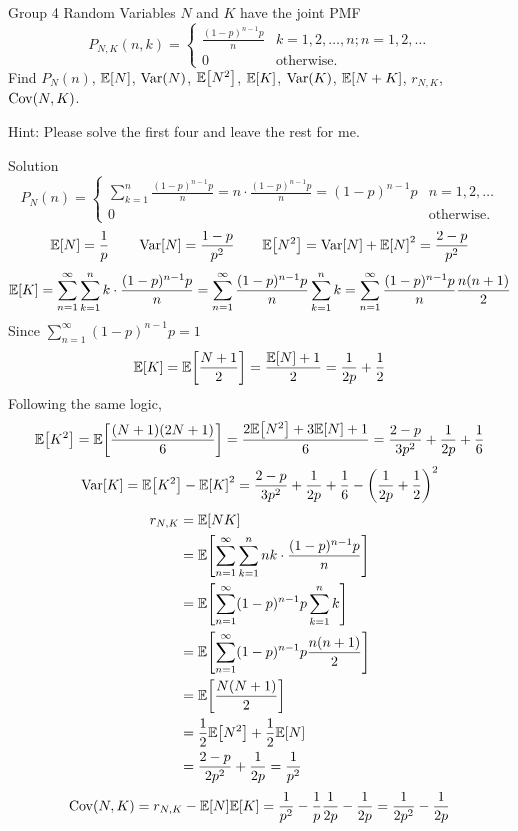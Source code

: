 \documentclass{article}
\begin{document}
\begin{problem}
    {Group 4}
    Random Variables $N$ and $K$ have the joint PMF
    \[
    P_{N,K}(n,k)={
        \begin{cases}
            \frac{(1-p)^{n-1}p}{n} & k=1,2,\ldots,n; n=1,2,\ldots\\
            0 & \text{otherwise.}
        \end{cases}
    }
    \]
    Find $P_N(n)$, $\E{N}$, $\mathop{\mathrm{Var}}\nolimits(N)$, $\E{N^2}$, $\E{K}$, $\mathop{\mathrm{Var}}\nolimits(K)$, $\E{N+K}$, $r_{N,K}$, $\mathop{\mathrm{Cov}}\nolimits(N,K)$.
    \begin{solution}
        {Hint:}
        Please solve the first four and leave the rest for me.
    \end{solution}
\end{problem}

\begin{solution}
    {Solution}
    \[
    P_N(n)={
        \begin{cases}
            \sum_{k=1}^{n}\frac{(1-p)^{n-1}p}{n}=n\cdot\frac{(1-p)^{n-1}p}{n}=(1-p)^{n-1}p & n=1,2,\ldots\\
            0 & \text{otherwise.}
        \end{cases}
    }
    \]
    \[
    \E{N} = \frac{1}{p} \qquad \Var[N] = \frac{1-p}{p^2} \qquad \E{N^2} = \Var[N] + \E{N}^2 = \frac{2-p}{p^2}
    \]
    \[
    \E{K} = \sum_{n=1}^{\infty}\sum_{k=1}^{n}k\cdot\frac{(1-p)^{n-1}p}{n} = \sum_{n=1}^{\infty}\frac{(1-p)^{n-1}p}{n}\sum_{k=1}^{n}k = \sum_{n=1}^{\infty}\frac{(1-p)^{n-1}p}{n}\frac{n(n+1)}{2}
    \]
    Since $\sum_{n=1}^{\infty}(1-p)^{n-1}p=1$
    \[
        \E{K} = \E{\frac{N+1}{2}} = \frac{\E{N}+1}{2} = \frac{1}{2p}+\frac{1}{2}
    \]
    Following the same logic,
    \[
    \E{K^2} = \E{\frac{(N+1)(2N+1)}{6}}=\frac{2\E{N^2}+3\E{N}+1}{6}= \frac{2-p}{3p^2}+\frac{1}{2p}+\frac{1}{6}
    \]
    \[
    \Var[K] = \E{K^2}-\E{K}^2 = \frac{2-p}{3p^2}+\frac{1}{2p}+\frac{1}{6}-\left(\frac{1}{2p}+\frac{1}{2}\right)^2
    \]
    \begin{align*}
        r_{N,K}
        &= \E{NK} \\
        &= \E{\sum_{n=1}^{\infty}\sum_{k=1}^{n}nk\cdot\frac{(1-p)^{n-1}p}{n}} \\
        &= \E{\sum_{n=1}^{\infty}(1-p)^{n-1}p\sum_{k=1}^{n}k} \\
        &= \E{\sum_{n=1}^{\infty}(1-p)^{n-1}p\frac{n(n+1)}{2}} \\
        &= \E{\frac{N(N+1)}{2}} \\
        &= \frac{1}{2}\E{N^2}+\frac{1}{2}\E{N} \\
        &= \frac{2-p}{2p^2}+\frac{1}{2p} = \frac{1}{p^2}
    \end{align*}
    \[
    \Cov(N,K) = r_{N,K}-\E{N}\E{K} = \frac{1}{p^2}-\frac{1}{p}\frac{1}{2p}-\frac{1}{2p} = \frac{1}{2p^2}-\frac{1}{2p}
    \]
\end{solution}
\end{document}
